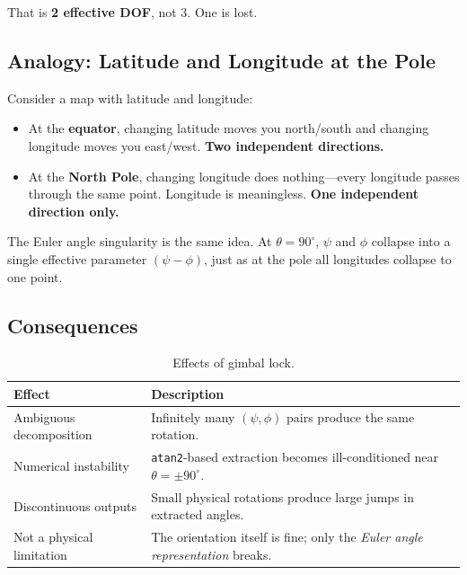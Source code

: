 \documentclass[12pt,a4paper]{article}
\begin{document}
That is \textbf{2 effective DOF}, not 3. One is lost.

\subsection{Analogy: Latitude and Longitude at the Pole}

Consider a map with latitude and longitude:

\begin{itemize}
  \item At the \textbf{equator}, changing latitude moves you north/south and
        changing longitude moves you east/west.
        \textbf{Two independent directions.}
  \item At the \textbf{North Pole}, changing longitude does nothing---every
        longitude passes through the same point. Longitude is meaningless.
        \textbf{One independent direction only.}
\end{itemize}

The Euler angle singularity is the same idea. At $\theta = 90^\circ$, $\psi$
and $\phi$ collapse into a single effective parameter $(\psi - \phi)$, just as
at the pole all longitudes collapse to one point.

\subsection{Consequences}

\begin{table}[h]
\centering
\begin{tabular}{@{}p{4cm}p{9cm}@{}}
\toprule
\textbf{Effect} & \textbf{Description} \\
\midrule
Ambiguous decomposition & Infinitely many $(\psi,\phi)$ pairs produce the
  same rotation. \\
Numerical instability & \texttt{atan2}-based extraction becomes
  ill-conditioned near $\theta = \pm 90^\circ$. \\
Discontinuous outputs & Small physical rotations produce large jumps in
  extracted angles. \\
Not a physical limitation & The orientation itself is fine; only the
  \emph{Euler angle representation} breaks. \\
\bottomrule
\end{tabular}
\caption{Effects of gimbal lock.}
\end{table}
\end{document}
